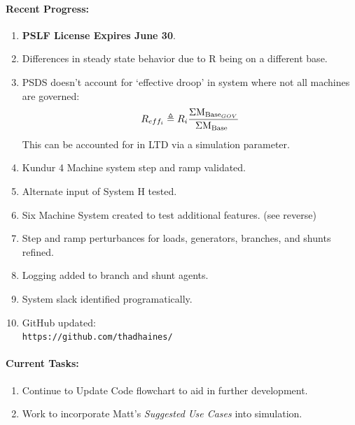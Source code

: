 \documentclass[12pt]{article}
\begin{document}
\begin{multicols}{2}
\raggedright
	\paragraph{Recent Progress:}
	\begin{enumerate}

		\item \textbf{PSLF License Expires June 30}.

		\item Differences in steady state behavior due to R being on a different base.

		\item PSDS doesn't account for `effective droop' in system where not all machines are governed:
		\[R_{eff_i} \triangleq R_i \dfrac{\Sigma \text{M}_{\text{Base}_{GOV}} }{\Sigma \text{M}_{\text{Base}_{\ }}}  \]
		This can be accounted for in LTD via a simulation parameter.
		
		\item Kundur 4 Machine system step and ramp validated.
		
		\item Alternate input of System H tested.
		
		\item Six Machine System created to test additional features. (see reverse)
		
		\item Step and ramp perturbances for loads, generators, branches, and shunts refined.
		\item Logging added to branch and shunt agents.
		
		\item System slack identified programatically.

		\item GitHub updated:\\
		\verb|https://github.com/thadhaines/|
		
	\end{enumerate}
\paragraph{Current Tasks:}
	\begin{enumerate}

		\item Continue to Update Code flowchart to aid in further development.

		\item Work to incorporate Matt's \emph{Suggested Use Cases} into simulation.
		\begin{itemize}
		

\end{itemize}
\end{enumerate}
\end{multicols}
\end{document}
